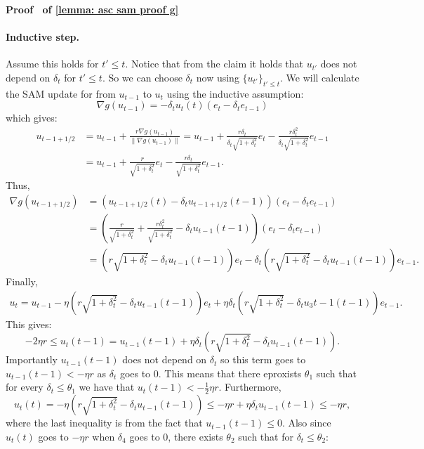 \documentclass[11pt]{article}
\newcommand{\rad}{r}
\renewenvironment{proof}[1][]{%
  \par\noindent\textbf{\upshape Proof%
  \if\relax\detokenize{#1}\relax\else\ #1\fi}\ %
}{\jmlrQED}
\begin{document}
\begin{proof}[of \cref{lemma: asc sam proof g}]
\paragraph{Inductive step.} Assume this holds for $t' \leq t$. Notice that from the claim it holds that $u_{t'}$ does not depend on $\delta_t$ for $t' \leq t$. So we can choose $\delta_t$ now using $\{u_{t'}\}_{t' \leq t}$. We will calculate the SAM update for from $u_{t-1}$ to $u_t$ using the inductive assumption: 
$$\nabla g(u_{t-1}) = -\delta_{t} u_t(t)(e_t - \delta_t e_{t-1})$$
which gives:
\begin{align*}
    u_{t-1+1/2} & = u_{t-1} + \frac{\rad \nabla g(u_{t-1})}{\|\nabla g(u_{t-1})\|} = u_{t-1} + \frac{\rad\delta_t}{\delta_{t}\sqrt{1+ \delta_{t}^2}}e_t - \frac{\rad \delta_t^2}{\delta_t\sqrt{ 1+ \delta_t^2}}e_{t-1} \\
    & = u_{t-1} + \frac{\rad}{\sqrt{1+ \delta_t^2}}e_t - \frac{\rad \delta_t}{\sqrt{ 1+ \delta_t^2}}e_{t-1}.
\end{align*}
Thus,
\begin{align*}
    \nabla g(u_{t-1+1/2}) &= (u_{t-1+1/2}(t) - \delta_t u_{t-1+1/2}(t-1)) (e_{t} - \delta_t e_{t-1})\\
    & = \left(\frac{\rad}{\sqrt{1+\delta_t^2}} + \frac{\rad  \delta_t^2}{\sqrt{1+ \delta_t^2}} -\delta_t u_{t-1}(t-1)\right)\left(e_{t} - \delta_t e_{t-1}\right) \\
    & = \left(\rad  \sqrt{1+ \delta_t^2} - \delta_t u_{t-1}(t-1)\right) e_t - \delta_t \left(\rad  \sqrt{1+ \delta_t^2} - \delta_t u_{t-1}(t-1)\right) e_{t-1}.
\end{align*}
Finally, 
\begin{align*}
    u_t = u_{t-1} - \eta \left(\rad  \sqrt{1+ \delta_t^2} - \delta_t u_{t-1}(t-1)\right) e_t + \eta \delta_t \left(\rad  \sqrt{1+ \delta_t^2} - \delta_t u_3
    {t-1}(t-1)\right) e_{t-1}. 
\end{align*} 
This gives:
$$- 2\eta\rad \leq u_t(t-1) = u_{t-1}(t-1) +  \eta \delta_t \left(\rad  \sqrt{1+ \delta_t^2} - \delta_t u_{t-1}(t-1)\right).$$
Importantly $u_{t-1}(t-1)$ does not depend on $\delta_t$ so this term goes to $u_{t-1}(t-1) < -\eta \rad$ as $\delta_t$ goes to $0$. This means that there eproxists $\theta_1$ such that for every $\delta_t \leq \theta_1$ we have that $u_t(t-1) < -\frac{1}{2} \eta\rad$.
Furthermore,
$$u_{t}(t) = -\eta \left(\rad  \sqrt{1+ \delta_t^2} - \delta_t u_{t-1}(t-1)\right) \leq -\eta \rad  + \eta \delta_t u_{t-1}(t-1) \leq -\eta \rad,$$
where the last inequality is from the fact that $u_{t-1}(t-1) \leq 0$. Also since $u_t(t)$ goes to $-\eta \rad$ when $\delta_4$ goes to $0$, there exists $\theta_2$ such that for $\delta_t \leq \theta_2$: 

\end{proof}
\end{document}
